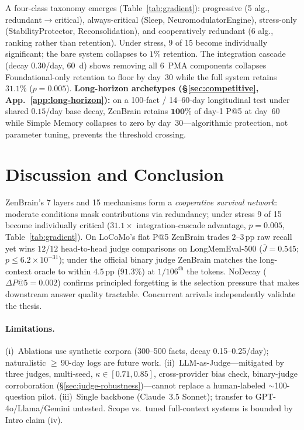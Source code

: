 \documentclass{article}
\begin{document}
A four-class taxonomy emerges (Table~\ref{tab:gradient}): progressive
(5 alg., redundant$\to$critical), always-critical (Sleep,
NeuromodulatorEngine), stress-only (StabilityProtector, Reconsolidation),
and cooperatively redundant (6 alg., ranking rather than retention).
Under stress, 9 of 15 become individually significant; the bare system
collapses to $1\%$ retention. The integration cascade (decay 0.30/day,
60~d) shows removing all 6~PMA components collapses Foundational-only
retention to floor by day~30 while the full system retains $31.1\%$
($p{=}0.005$). \textbf{Long-horizon archetypes
(\S\ref{sec:competitive}, App.~\ref{app:long-horizon}):} on a
100-fact / 14--60-day longitudinal test under shared $0.15$/day base
decay, ZenBrain retains $\mathbf{100\%}$ of day-1 P@5 at day~60 while
Simple Memory collapses to zero by day~30---algorithmic protection,
not parameter tuning, prevents the threshold crossing.

\label{sec:competitive}

\section{Discussion and Conclusion}
\label{sec:discussion}

ZenBrain's 7 layers and 15 mechanisms form a \emph{cooperative
survival network}: moderate conditions mask contributions via
redundancy; under stress 9 of 15 become individually critical
($31.1\times$ integration-cascade advantage, $p{=}0.005$,
Table~\ref{tab:gradient}). On LoCoMo's flat P@5 ZenBrain trades
$2$--$3$\,pp raw recall yet wins $12/12$ head-to-head judge
comparisons on LongMemEval-500
($\bar{J}{=}0.545$; $p{\leq}6.2{\times}10^{-31}$); under the official
binary judge ZenBrain matches the long-context oracle to within
$4.5$\,pp ($91.3\%$) at $1/106^\text{th}$ the tokens. NoDecay
($\Delta P@5{=}0.002$) confirms principled forgetting is the selection
pressure that makes downstream answer quality tractable. Concurrent
arrivals
\citep{du2026memory,karpathy2026knowledge,anthropic2026autodream,tiwari2026multilayered,iclr2026memagents}
independently validate the thesis.

\paragraph{Limitations.}\label{sec:limitations}
(i)~Ablations use synthetic corpora (300--500 facts, decay
0.15--0.25/day); naturalistic $\geq$\,90-day logs are future work.
(ii)~LLM-as-Judge---mitigated by three judges, multi-seed,
$\kappa{\in}[0.71,0.85]$, cross-provider bias check, binary-judge
corroboration (\S\ref{sec:judge-robustness})---cannot replace a
human-labeled $\sim$100-question pilot.
(iii)~Single backbone (Claude~3.5 Sonnet); transfer to
GPT-4o/Llama/Gemini untested. Scope vs.\ tuned full-context systems
is bounded by Intro claim (iv).
\end{document}

